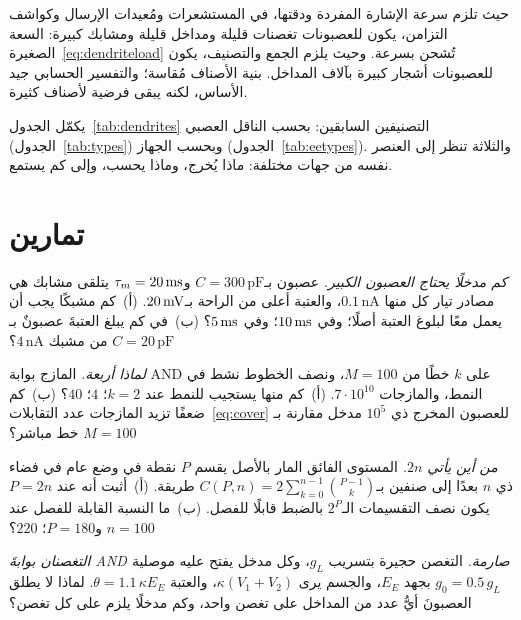 \begin{keyblock}
\begin{proposition}
\label{prop:dendrites}
حيث تلزم سرعة الإشارة المفردة ودقتها، في المستشعرات ومُعيدات الإرسال وكواشف التزامن، يكون للعصبونات تغصنات قليلة ومداخل قليلة ومشابك كبيرة: السعة الصغيرة~\eqref{eq:dendriteload} تُشحن بسرعة. وحيث يلزم الجمع والتصنيف، يكون للعصبونات أشجار كبيرة بآلاف المداخل. بنية الأصناف مُقاسة؛ والتفسير الحسابي جيد الأساس، لكنه يبقى فرضية لأصناف كثيرة.
\end{proposition}
\end{keyblock}

يكمّل الجدول~\ref{tab:dendrites} التصنيفين السابقين: بحسب الناقل العصبي (الجدول~\ref{tab:types}) وبحسب الجهاز (الجدول~\ref{tab:eetypes}). والثلاثة تنظر إلى العنصر نفسه من جهات مختلفة: ماذا يُخرج، وماذا يحسب، وإلى كم يستمع.

\section{تمارين}

\begin{exercise}[\lvlA]
\label{ex:19:1}
\emph{كم مدخلًا يحتاج العصبون الكبير.} عصبون بـ$C=300\,\text{pF}$ و$\tau_m=20\,\text{ms}$ يتلقى مشابك هي مصادر تيار كل منها $0.1\,\text{nA}$، والعتبة أعلى من الراحة بـ$20\,\text{mV}$. (أ)~كم مشبكًا يجب أن يعمل معًا لبلوغ العتبة أصلًا؛ وفي $10\,\text{ms}$؛ وفي $5\,\text{ms}$؟ (ب)~في كم يبلغ العتبةَ عصبونٌ بـ$C=20\,\text{pF}$ من مشبك $4\,\text{nA}$؟
\end{exercise}

\begin{exercise}[\lvlA]
\label{ex:19:2}
\emph{لماذا أربعة.} المازج بوابة AND على $k$ خطًا من $M=100$، ونصف الخطوط نشط في النمط، والمازجات $7\cdot10^{10}$. (أ)~كم منها يستجيب للنمط عند $k=2$؛ $4$؛ $40$؟ (ب)~كم ضعفًا تزيد المازجات عدد التقابلات~\eqref{eq:cover} للعصبون المخرج ذي $10^5$ مدخل مقارنة بـ$M=100$ خط مباشر؟
\end{exercise}

\begin{exercise}[\lvlB]
\label{ex:19:3}
\emph{من أين يأتي $2n$.} المستوى الفائق المار بالأصل يقسم $P$ نقطة في وضع عام في فضاء ذي $n$ بعدًا إلى صنفين بـ$C(P,n)=2\sum_{k=0}^{n-1}\binom{P-1}{k}$ طريقة. (أ)~أثبت أنه عند $P=2n$ يكون نصف التقسيمات الـ$2^P$ بالضبط قابلًا للفصل. (ب)~ما النسبة القابلة للفصل عند $n=100$ و$P=180$؛ $220$؟
\end{exercise}

\begin{exercise}[\lvlB]
\label{ex:19:4}
\emph{التغصنان بوابةَ AND صارمة.} التغصن حجيرة بتسريب $g_L$، وكل مدخل يفتح عليه موصلية $g_0=0.5\,g_L$ بجهد $E_E$، والجسم يرى $\kappa(V_1+V_2)$، والعتبة $\theta=1.1\,\kappa E_E$. لماذا لا يطلق العصبونَ أيُّ عدد من المداخل على تغصن واحد، وكم مدخلًا يلزم على كل تغصن؟
\end{exercise}

